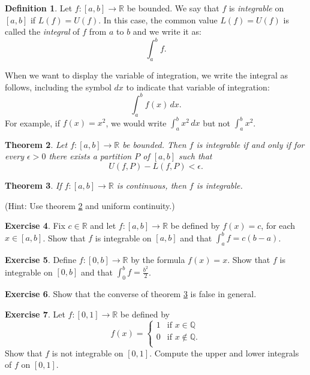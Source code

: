 \documentclass[12pt]{article}
\newcommand{\bbQ}{\mathbb{Q}}
\newcommand{\bbR}{\mathbb{R}}
\providecommand{\arr}{\longrightarrow}
\renewcommand{\_}[1]{\underline{ #1 }}
\newtheorem{theorem}{Theorem}[section]
\theoremstyle{definition}
\newtheorem{definition}[theorem]{Definition}
\newtheorem{exercise}[theorem]{Exercise}
\numberwithin{equation}{subsection}
\begin{document}
\begin{definition}  Let $f \colon [a, b] \arr \bbR$ be bounded.  We say that $f$ is \emph{integrable} on $[a, b]$ if $L(f) = U(f)$.  In this case, the common value $L(f) = U(f)$ is called the \emph{integral} of $f$ from $a$ to $b$ and we write it as:
\[
\int_{a}^{b} f.
\]
\end{definition}

When we want to display the variable of integration, we write the integral as follows, including
the symbol $dx$ to indicate that variable of integration:
\[
\int_{a}^{b} f(x) \, dx.
\]
For example, if $f(x)=x^2$, we would write 
$\displaystyle{\int_{a}^{b} x^2 \, dx}$ but not $\displaystyle{\int_{a}^{b} x^2}$.


\begin{theorem}\label{int_criterion}  Let $f \colon [a, b] \arr \bbR$ be bounded.  Then $f$ is integrable if and only if for every $\epsilon > 0$ there exists a partition $P$ of $[a, b]$ such that
\[
U(f, P) - L(f, P) < \epsilon.
\]
\end{theorem}


\begin{theorem}\label{cont_implies_integrable}  If $f \colon [a, b] \arr \bbR$ is continuous, then $f$ is integrable.
\end{theorem}

\noindent (Hint: Use theorem \ref{int_criterion} and uniform continuity.)

\begin{exercise}  
Fix $c\in\bbR$ and let $f:[a,b]\rightarrow \bbR$ be defined by $f(x)=c$, for each $x\in [a,b]$.
Show that $f$ is integrable on $[a,b]$ and that $\int_a^bf=c(b-a)$.
\end{exercise}

\begin{exercise}  
Define $f:[0,b]\rightarrow \bbR$ by the formula $f(x)=x$.  
Show that $f$ is integrable on $[0,b]$ and that $\int_0^bf=\frac{b^2}{2}$.
\end{exercise}

\begin{exercise}  
Show that the converse of theorem \ref{cont_implies_integrable} is false in general.
\end{exercise}

\begin{exercise}
Let $f:[0,1]\rightarrow\bbR$ be defined by 
$$
f(x)=\left\{
\begin{array}{cl}
1 & \mbox{if $x\in \bbQ$} \\
0 & \mbox{if $x\not\in \bbQ$.} \\
\end{array}
\right.
$$
Show that $f$ is not integrable on $[0,1]$.  Compute the upper and lower integrals of $f$ on $[0,1]$.
\end{exercise}
\end{document}
